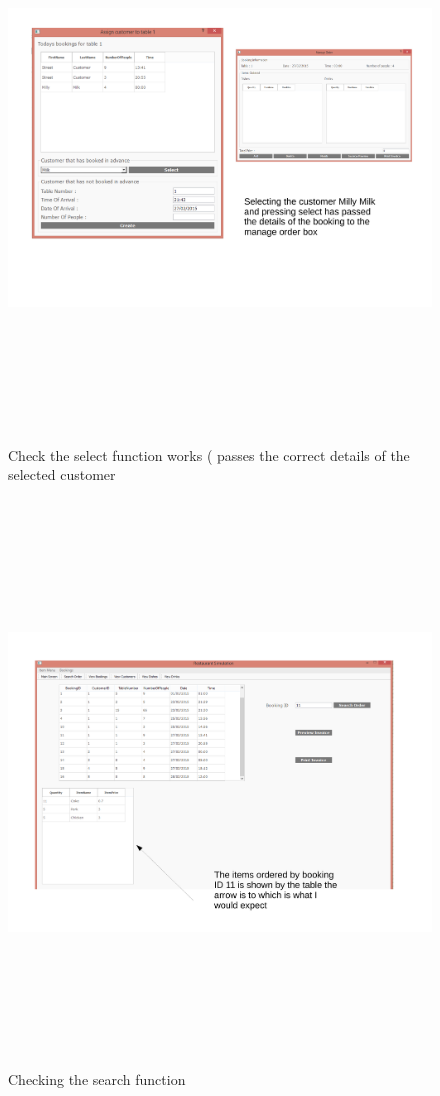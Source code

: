 \begin{landscape}
\begin{figure}[H]
    \includegraphics[height = 15cm]{./Testing/images/testt1.pdf}
    \caption{Check the select function works ( passes the correct details of the selected customer} \label{fig:Test1}
\end{figure}

\begin{figure}[H]
    \includegraphics[height = 15cm]{./Testing/images/booking11.pdf}
    \caption{Checking the search function} \label{fig:searchFunction}
\end{figure}


\end{landscape}
